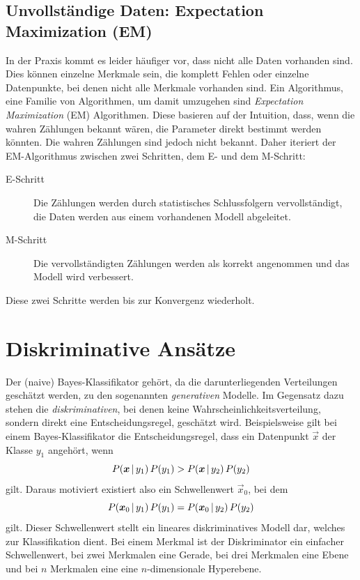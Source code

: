 		\subsection{Unvollständige Daten: Expectation Maximization (EM)}
			In der Praxis kommt es leider häufiger vor, dass nicht alle Daten vorhanden sind. Dies können \bspw einzelne Merkmale sein, die komplett Fehlen oder einzelne Datenpunkte, bei denen nicht alle Merkmale vorhanden sind. Ein Algorithmus, \bzw eine Familie von Algorithmen, um damit umzugehen sind \emph{Expectation Maximization} (EM) Algorithmen. Diese basieren auf der Intuition, dass, wenn die wahren Zählungen bekannt wären, die Parameter direkt bestimmt werden könnten. Die wahren Zählungen sind jedoch nicht bekannt. Daher iteriert der EM-Algorithmus zwischen zwei Schritten, dem E- und dem M-Schritt:
			\begin{description}
				\item[E-Schritt] Die Zählungen werden durch statistisches Schlussfolgern vervollständigt, \dh die Daten werden aus einem vorhandenen Modell abgeleitet.
				\item[M-Schritt] Die vervollständigten Zählungen werden als korrekt angenommen und das Modell wird verbessert.
			\end{description}
			Diese zwei Schritte werden bis zur Konvergenz wiederholt.

	\section{Diskriminative Ansätze}
		Der (naive) Bayes-Klassifikator gehört, da die darunterliegenden Verteilungen geschätzt werden, zu den sogenannten \emph{generativen} Modelle. Im Gegensatz dazu stehen die \emph{diskriminativen}, bei denen keine Wahrscheinlichkeitsverteilung, sondern direkt eine Entscheidungsregel, geschätzt wird. Beispielsweise gilt bei einem Bayes-Klassifikator die Entscheidungsregel, dass ein Datenpunkt \(\vec{x}\) der Klasse \(y_1\) angehört, wenn
		\begin{equation}
			P(\bm{x} \,\vert\, y_1) \, P(y_1) > P(\bm{x} \,\vert\, y_2) \, P(y_2)
		\end{equation}
		gilt. Daraus motiviert existiert also ein Schwellenwert \(\vec{x}_0\), bei dem
		\begin{equation}
			P(\bm{x}_0 \,\vert\, y_1) \, P(y_1) = P(\bm{x}_0 \,\vert\, y_2) \, P(y_2)
		\end{equation}
		gilt. Dieser Schwellenwert stellt ein lineares diskriminatives Modell dar, welches zur Klassifikation dient. Bei einem Merkmal ist der Diskriminator ein einfacher Schwellenwert, bei zwei Merkmalen eine Gerade, bei drei Merkmalen eine Ebene und bei \(n\) Merkmalen eine eine \(n\)-dimensionale Hyperebene.

